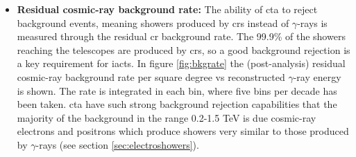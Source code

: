 \documentclass[main.tex]{subfiles}
\begin{document}
\begin{itemize}
\item \textbf{Residual cosmic-ray background rate:} The ability of \gls{cta} to reject background events, meaning showers produced by \glspl{cr} instead of $\gamma$-rays is measured through the residual \gls{cr} background rate. The 99.9\% of the showers reaching the telescopes are produced by \glspl{cr}, so a good background rejection is a key requirement for \glspl{iact}. In figure \ref{fig:bkgrate} the (post-analysis) residual cosmic-ray background rate per square degree vs reconstructed $\gamma$-ray energy is shown. The rate is integrated in each bin, where five bins per decade has been taken. \gls{cta} have such strong background rejection capabilities that the majority of the background in the range 0.2-1.5 TeV is due cosmic-ray electrons and positrons \cite{2017ICRCCTAPerformance} which produce showers very similar to those produced by $\gamma$-rays (see section \ref{sec:electroshowers}).\\


\end{itemize}
\end{document}
